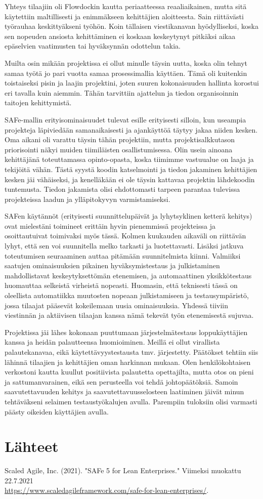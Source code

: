 \documentclass[11pt]{article}
\begin{document}
Yhteys tilaajiin oli Flowdockin kautta periaatteessa reaaliaikainen, mutta sitä
käytettiin maltillisesti ja enimmäkseen kehittäjien aloitteesta. Sain
riittävästi työrauhaa keskittyäkseni työhön. Koin tällaisen viestikanavan
hyödylliseksi, koska sen nopeuden ansiosta kehittäminen ei koskaan keskeytynyt
pitkäksi aikaa epäselvien vaatimusten tai hyväksynnän odottelun takia.

Muilta osin mikään projektissa ei ollut minulle täysin uutta, koska olin tehnyt
samaa työtä jo pari vuotta samaa prosessimallia käyttäen. Tämä oli kuitenkin
toistaiseksi pisin ja laajin projektini, joten suuren kokonaisuuden
hallinta korostui eri tavalla kuin aiemmin. Tähän tarvittiin
ajattelun ja tiedon organisoinnin taitojen kehittymistä.

SAFe-mallin erityisominaisuudet tulevat esille erityisesti silloin, kun
useampia projekteja läpiviedään samanaikai\-sesti ja ajankäyttöä täytyy jakaa
niiden kesken. Oma aikani oli varat\-tu täysin tähän projektiin, mutta
projektisalkkutason priorisointi näkyi muiden tiimiläisten osallistumisessa. Olin
usein ainoana kehittäjänä toteuttamassa opinto-opasta, koska tii\-mim\-me vastuualue on laaja ja
tekijöitä vähän. Tästä syystä koodin katselmointi ja tiedon jakaminen
kehittäjien kesken jäi vähäiseksi, ja kenelläkään ei ole täysin kattavaa
projektin lähdekoodin tuntemusta. Tiedon jakamista olisi
ehdottomasti tarpeen parantaa tulevissa projekteissa laadun ja ylläpitokyvyn
varmistamiseksi.

SAFen käytännöt (erityisesti suunnittelupäivät ja lyhytsyklinen ketterä kehitys)
ovat mieles\-täni toi\-mineet erittäin hyvin pienemmissä projekteissa ja
osoittautuivat toimivaksi myös tässä. Kolmen kuukauden aikaväli on riittävän
lyhyt, että sen voi suunnitella melko tarkasti ja luotettavasti. Lisäksi jatkuva
toteutumisen seuraaminen auttaa pitämään suunnitelmista kiinni. Valmiik\-si
saatu\-jen omi\-naisuuksien pi\-kai\-nen hyväksymistestaus ja julkistaminen mahdollistavat
keskeytyksettömän ete\-nemisen, ja automaattinen yksikkötestaus huomauttaa selkeistä
virheistä nopeasti. Huomasin, että teknisesti tässä on oleellista
automatiikka muutosten nopeaan julkistamiseen ja testausympäristö, jossa tilaajat
pää\-sevät kokeilemaan uusia ominaisuuksia. Yhdessä tiiviin viestinnän ja
aktiivisen tilaa\-jan kanssa nämä teke\-vät työn etenemisestä sujuvaa.

Projektissa jäi lähes kokonaan puuttumaan järjestelmätestaus
loppukäyttäjien kanssa ja heidän pa\-lautteensa huomioiminen. Meillä ei ollut
virallista palautekanavaa, eikä käy\-tettä\-vyystestaus\-ta tmv. järjestetty. Päätökset
tehtiin siis lähinnä tilaajien ja kehittäjien oman harkinnan mukaan. Olen
henkilökohtaisen verkostoni kautta kuullut positiivista palautetta opettajilta,
mutta otos on pieni ja sattumanvarainen, eikä sen perusteella voi tehdä
joh\-topäätöksiä. Samoin saavutettavuuden kehitys ja saavutettavuusselosteen
laatiminen jäi\-vät minun tehtäväkseni selai\-men testaustyökalujen avulla.
Parempiin tuloksiin olisi varmasti päästy oikeiden käyttäjien avulla.

\section*{Lähteet}

Scaled Agile, Inc. (2021). "SAFe 5 for Lean Enterprises." Viimeksi muokattu 22.7.2021
\\ \url{https://www.scaledagileframework.com/safe-for-lean-enterprises/}.
\end{document}
